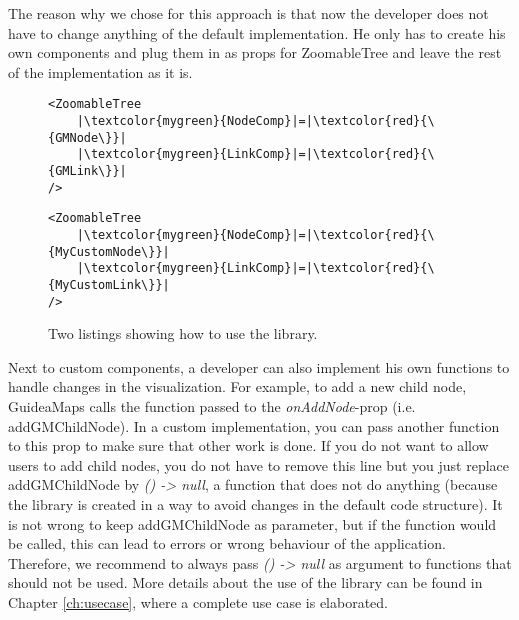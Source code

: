 The reason why we chose for this approach is that now the developer does not have to change anything of the default implementation. He only has to create his own components and plug them in as props for ZoomableTree and leave the rest of the implementation as it is.\\

\begin{figure}[H]
	\begin{minipage}{0.5\textwidth}
 		 \centering
		 \begin{verbatim}
<ZoomableTree
    |\textcolor{mygreen}{NodeComp}|=|\textcolor{red}{\{GMNode\}}|
    |\textcolor{mygreen}{LinkComp}|=|\textcolor{red}{\{GMLink\}}|
/>
		\end{verbatim}
		\label{lst:default-components}
	\end{minipage}
 	\begin{minipage}{0.5\textwidth}
  		\centering
  		\begin{verbatim}
<ZoomableTree
    |\textcolor{mygreen}{NodeComp}|=|\textcolor{red}{\{MyCustomNode\}}|
    |\textcolor{mygreen}{LinkComp}|=|\textcolor{red}{\{MyCustomLink\}}|
/>
		\end{verbatim}
		\label{lst:custom-components}
 	\end{minipage}
	\caption{Two listings showing how to use the library.}
	\label{fig:examplecode-library}
\end{figure}

Next to custom components, a developer can also implement his own functions to handle changes in the visualization. For example, to add a new child node, GuideaMaps calls the function passed to the \textit{onAddNode}-prop (i.e. addGMChildNode). In a custom implementation, you can pass another function to this prop to make sure that other work is done. If you do not want to allow users to add child nodes, you do not have to remove this line but you just replace addGMChildNode by \textit{() -> null}, a function that does not do anything (because the library is created in a way to avoid changes in the default code structure). It is not wrong to keep addGMChildNode as parameter, but if the function would be called, this can lead to errors or wrong behaviour of the application. Therefore, we recommend to always pass \textit{() -> null} as argument to functions that should not be used. More details about the use of the library can be found in Chapter \ref{ch:usecase}, where a complete use case is elaborated.



